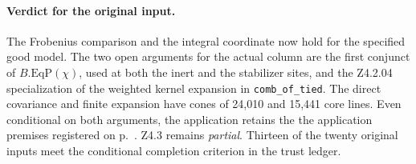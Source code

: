 \paragraph{Verdict for the original input.}
The Frobenius comparison and the integral coordinate now hold for the specified good model.
The two open arguments for the actual column are the first conjunct of
$B.\mathrm{EqP}(\chi)$, used at both the inert and the stabilizer sites, and the
Z4.2.04 specialization of the weighted kernel expansion in \nolinkurl{comb_of_tied}.
The direct covariance and finite expansion have cones of 24,010 and 15,441
core lines. Even conditional on both arguments, the application retains the
the application premises registered on p.~\pageref{r10:z43-register}.
Z4.3 remains \emph{partial}. Thirteen of the twenty original inputs meet the
conditional completion criterion in the trust ledger.

